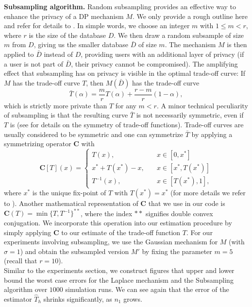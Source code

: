 \noindent \textbf{Subsampling algorithm.} Random subsampling provides an effective way to enhance the privacy of a DP mechanism $M$. We only provide a rough outline here and refer for details to \cite{Dong2022}.
In simple words, we choose an integer $m$ with  $1\leq m< r$, where $r$ is the size of the database $D$. We then draw a random subsample of size $m$ from $D$, giving us the smaller database $\bar D$ of size $m$. The mechanism $M$ is then applied to $\bar D$ instead of $D$, providing users with an additional layer of privacy (if a user is not part of $\bar D$, their privacy cannot be compromised). The amplifying effect that subsampling has on privacy is visible in the optimal trade-off curve: If $M$ has the trade-off curve $T$, then $M(\bar D)$ has the trade-off curve
\begin{equation*}
    \bar T(\alpha)=  \frac{m}{r}T(\alpha)+\frac{r-m}{r}(1-\alpha),
\end{equation*}
which is strictly more private than $T$ for any $m<r$. A minor technical peculiarity of subsampling is that the resulting curve $\bar T$ is not necessarily symmetric, even if $T$ is (see \cite{Dong2022} for details on the symmetry of trade-off functions). Trade-off curves are usually considered to be symmetric and one can symmetrize $\bar T$ by applying a symmetrizing operator $\mathbf{C}$ with 
\begin{equation*}
    \mathbf{C}[T](x)=\begin{cases}
         T(x), \quad &x\in [0,x^*]\\
        x^*+ T (x^*)-x, \quad &x\in [x^*, T(x^*)]\\
         T^{-1}(x), \quad &x\in [ T(x^*),1],
    \end{cases}
\end{equation*}
where $x^*$ is the unique fix-point of $T$ with $T(x^*)=x^*$ (for more details we refer to \cite{Dong2022}). Another mathematical representation of $\mathbf{C}$ that we use in our code is 
$\mathbf{C}(T)=\min\{T,T^{-1}\}^{**}$, where the index $**$ signifies double convex conjugation. We incorporate this operation into our estimation procedure by simply applying $\mathbf{C}$ to our estimate of the trade-off function $T$. For our experiments involving subsampling, we use the Gaussian mechanism for $M$ (with $\sigma=1$) and obtain the subsampled version $M'$ by fixing the parameter $m=5$ (recall that $r=10$). \\




\noindent Similar to the experiments section, we construct figures that upper and lower bound the worst case errors for the Laplace mechanism and the Subsampling algorithm over $1000$ simulation runs. We can see again that the error of the estimator $\hat T_h$ shrinks significantly, as $n_1$ grows. 




